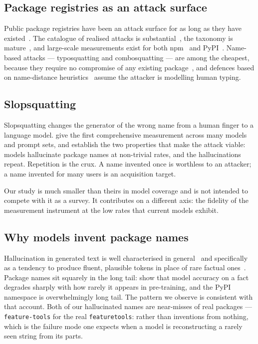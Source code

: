 \documentclass[journal]{IEEEtran}
\providecommand{\citep}[1]{\cite{#1}}
\providecommand{\citet}[1]{\cite{#1}}
\theoremstyle{definition}
\begin{document}
\subsection{Package registries as an attack surface}

Public package registries have been an attack surface for as long as they have
existed~\citep{cappos2008mirror}. The catalogue of realised attacks is
substantial~\citep{ohm2020backstabber}, the taxonomy is
mature~\citep{ladisa2023sok}, and large-scale measurements exist for both
npm~\citep{zimmermann2019npm, zahan2022weaklinks} and
PyPI~\citep{ruohonen2021pypi, alfadel2023python, kaplan2021survey}. Name-based
attacks --- typosquatting and combosquatting --- are among the cheapest, because
they require no compromise of any existing package~\citep{vu2020typosquatting,
duan2021measuring}, and defences based on name-distance
heuristics~\citep{taylor2020spellbound} assume the attacker is modelling human
typing.

\subsection{Slopsquatting}

Slopsquatting changes the generator of the wrong name from a human finger to a
language model. \citet{spracklen2025packages} give the first comprehensive
measurement across many models and prompt sets, and establish the two properties
that make the attack viable: models hallucinate package names at non-trivial
rates, and the hallucinations repeat. Repetition is the crux. A name invented
once is worthless to an attacker; a name invented for many users is an
acquisition target.

Our study is much smaller than theirs in model coverage and is not intended to
compete with it as a survey. It contributes on a different axis: the fidelity of
the measurement instrument at the low rates that current models exhibit.

\subsection{Why models invent package names}

Hallucination in generated text is well characterised in
general~\citep{ji2023hallucination, huang2025hallucination, maynez2020faithfulness}
and specifically as a tendency to produce fluent, plausible tokens in place of
rare factual ones~\citep{lin2022truthfulqa}. Package names sit squarely in the
long tail: \citet{kandpal2023longtail} show that model accuracy on a fact
degrades sharply with how rarely it appears in pre-training, and the PyPI
namespace is overwhelmingly long tail. The pattern we observe is consistent
with that account. Both of our hallucinated names are near-misses of real
packages --- \texttt{feature-tools} for the real \texttt{featuretools}: rather
than inventions from nothing, which is the failure mode one expects when a model
is reconstructing a rarely seen string from its parts.
\end{document}
